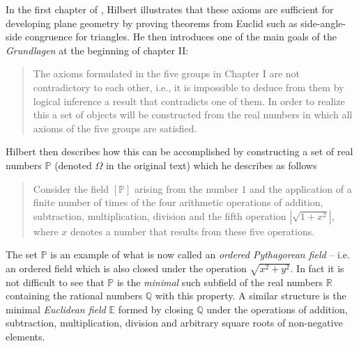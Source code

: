 \documentclass[11pt,fleqn,leqno]{article}
\begin{document}
In the first chapter of \citeyearpar{Hilbert1899}, Hilbert illustrates that these axioms are sufficient for developing  plane geometry by proving theorems from Euclid such as side-angle-side congruence for triangles.  He then introduces one of the main goals of the \textsl{Grundlagen} at the beginning of chapter II:
\begin{quote}
{\footnotesize
The axioms formulated in the five groups in Chapter I are not contradictory to each other, i.e., it is impossible to deduce from them by logical inference a result that contradicts one of them. In order to realize this a set of objects will be constructed from the real numbers in which all axioms of the five groups are satisfied. \hfill \citep[p. 29]{Hilbert1971}}
\end{quote}
Hilbert then describes how this can be accomplished by constructing a set of real numbers $\mathbb{P}$ (denoted $\Omega$ in the original text) which he describes as follows 
\begin{quote}
{\footnotesize Consider the field $[\mathbb{P}]$ arising from the number $1$ and the application of a finite number of times of the four arithmetic operations of addition, subtraction, multiplication, division and the fifth operation  $|\sqrt{1+x^2}|$, where $x$ denotes a number that results from these five operations.  \hfill \citeyearpar[p. 29]{Hilbert1971}}
\end{quote}
The set $\mathbb{P}$ is an example of what is now called an \textsl{ordered Pythagorean field} -- i.e. an ordered field which is also closed under the operation $\sqrt{x^2 + y^2}$.   In fact it is not difficult to see that $\mathbb{P}$ is the \textsl{minimal} such subfield of the real numbers $\mathbb{R}$ containing the rational numbers $\mathbb{Q}$ with this property.  A similar structure is the minimal \textsl{Euclidean field} $\mathbb{E}$ formed by closing $\mathbb{Q}$ under the operations of addition, subtraction, multiplication, division and arbitrary square roots of non-negative elements. 
\end{document}
